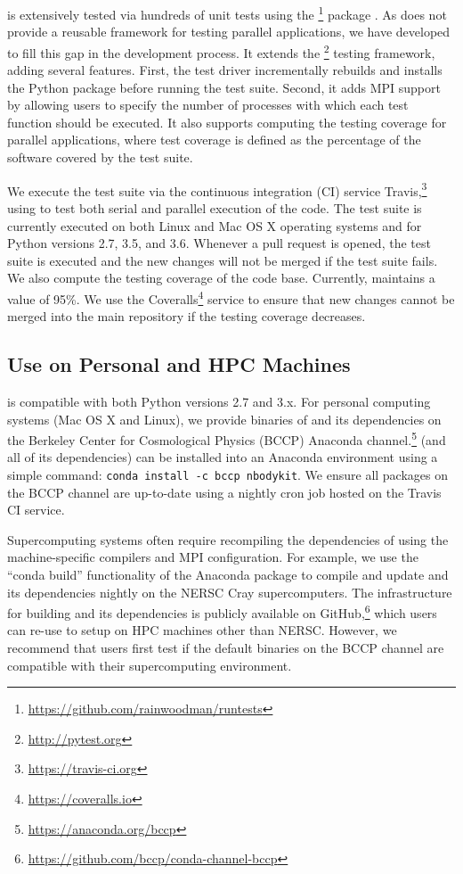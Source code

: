 \nbkit{} is extensively tested via hundreds of unit tests using the
\runtests{}\footnote{\url{https://github.com/rainwoodman/runtests}} package
\citep{runtests}. As \mpipy{} does not
provide a reusable framework for testing parallel applications, we have
developed \runtests{} to fill this gap in the development process.
It extends the \footnote{\url{http://pytest.org}}
testing framework, adding several features. First, the test driver
incrementally rebuilds and installs the Python package before running the
test suite. Second, it adds MPI support by allowing users to specify the
number of processes with which each test function should be executed.
It also supports computing the testing coverage for parallel applications,
where test coverage is defined as the percentage of the software
covered by the test suite.

We execute the \nbkit{} test suite via the continuous integration (CI) service
Travis,\footnote{\url{https://travis-ci.org}} using \runtests{} to test
both serial and parallel execution of the code. The test suite is
currently executed on both Linux and Mac OS X operating systems and for Python
versions 2.7, 3.5, and 3.6. Whenever a pull request is opened, the test suite
is executed and the new changes will not be merged if the test suite fails.
We also compute the testing coverage of the code base. Currently, \nbkit{}
maintains a value of 95\%. We use the
Coveralls\footnote{\url{https://coveralls.io}} service to ensure that new
changes cannot be merged into the main repository if the testing coverage
decreases.

\subsection{Use on Personal and HPC Machines}\label{sec:installing}

\nbkit{} is compatible with both Python versions 2.7 and 3.x.
For personal computing systems (Mac OS X and Linux), we provide binaries of
\nbkit{} and its dependencies on the Berkeley Center for
Cosmological Physics (BCCP)
Anaconda channel.\footnote{\url{https://anaconda.org/bccp}}
\nbkit{} (and all of its dependencies) can be installed into an Anaconda
environment using a simple command: \texttt{conda install -c bccp nbodykit}.
We ensure all packages on the BCCP channel are up-to-date using a
nightly cron job hosted on the Travis CI service.

Supercomputing systems often require recompiling the
dependencies of \nbkit{} using the machine-specific compilers and MPI
configuration. For example, we use the ``conda build'' functionality of the
Anaconda package to compile and update \nbkit{} and its dependencies nightly
on the NERSC Cray supercomputers. The infrastructure for building
\nbkit{} and its dependencies is publicly available on
GitHub,\footnote{\url{https://github.com/bccp/conda-channel-bccp}} which users can
re-use to setup \nbkit{} on HPC machines other than NERSC. However,
we recommend that users first test if the default binaries on the BCCP
channel are compatible with their supercomputing environment.

